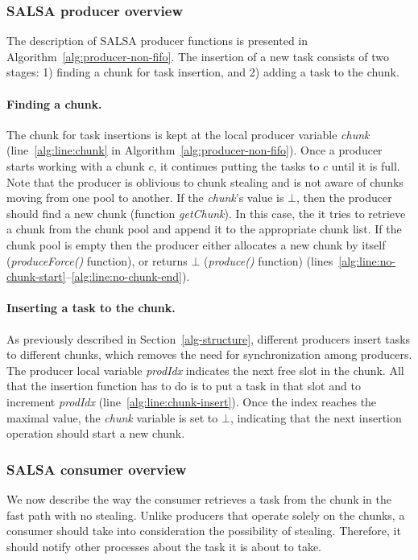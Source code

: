 \subsubsection {SALSA producer overview}

The description of SALSA producer functions is presented in Algorithm~\ref{alg:producer-non-fifo}. 
The insertion of a new task consists of two stages: 
1) finding a chunk for task insertion, and 2) adding a task to the chunk. 

\paragraph {Finding a chunk.}
The chunk for task insertions is kept at the local producer variable \emph{chunk} (line~\ref{alg:line:chunk} in Algorithm~\ref{alg:producer-non-fifo}). 
Once a producer starts working with a chunk $c$, it continues putting the tasks to $c$ until it is full. 
Note that the producer is oblivious to chunk stealing and is not aware of chunks moving from one pool to another. 
If the \emph{chunk}'s value is $\bot$, then the producer should find a new chunk (function \emph{getChunk}). 
In this case, the it tries to retrieve a chunk from the chunk pool and append it to the appropriate chunk list. If the chunk pool is empty then the producer either allocates a new chunk by itself (\emph{produceForce()} function), or returns $\bot$ (\emph{produce()} function) (lines~\ref{alg:line:no-chunk-start}--\ref{alg:line:no-chunk-end}). 

\paragraph {Inserting a task to the chunk.}
As previously described in Section~\ref{alg-structure}, different producers insert tasks to different chunks, which removes the need for synchronization among producers. 
The producer local variable \emph{prodIdx} indicates the next free slot in the chunk.
All that the insertion function has to do is to put a task in that slot and to increment \emph{prodIdx} (line~\ref{alg:line:chunk-insert}).
Once the index reaches the maximal value, the \emph{chunk} variable is set to $\bot$, indicating that the next insertion operation should start a new chunk. 

\subsubsection {SALSA consumer overview}

We now describe the way the consumer retrieves a task from the chunk in the fast path with no stealing. 
Unlike producers that operate solely on the chunks, a consumer should take into consideration the possibility of stealing. 
Therefore, it should notify other processes about the task it is about to take. 

